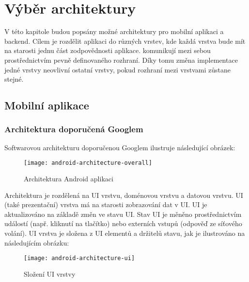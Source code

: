 \chapter{Výběr architektury}

\begin{chapterabstract}
	V této kapitole budou popsány možné architektury pro mobilní aplikaci a backend. Cílem je rozdělit aplikaci do různých vrstev, kde každá vrstva bude mít na starosti jednu část zodpovědnosti aplikace. komunikují mezi sebou prostřednictvím pevně definovaného rozhraní. Díky tomu změna implementace jedné vrstvy neovlivní ostatní vrstvy, pokud rozhraní mezi vrstvami zůstane stejné.
\end{chapterabstract}

\section{Mobilní aplikace}

\subsection{Architektura doporučená Googlem}
\label{subsec:architecture-google}
Softwarovou architekturu doporučenou Googlem \cite{android-architecture} ilustruje následující obrázek:

\begin{figure}[h!]
	\centering
	
	\texttt{[image: android-architecture-overall]}
	
	\caption{Architektura Android aplikaci \cite{android-architecture}}
	\label{fig:android-architecture-overall}
\end{figure}

\noindent Architektura je rozdělená na UI vrstvu, doménovou vrstvu a datovou vrstvu. UI (také prezentační) vrstva má na starosti zobrazování dat v UI. UI je aktualizováno na základě změn ve stavu UI. Stav UI je měněno prostřednictvím událostí (např. kliknutí na tlačítko) nebo externích vstupů (odpověď ze síťového volání). UI vrstva je složena z UI elementů a držitelů stavu, jak je ilustrováno na následujícím obrázku:

\begin{figure}[H]
	\centering
	
	\texttt{[image: android-architecture-ui]}
	
	\caption{Složení UI vrstvy \cite{android-architecture}}
	\label{fig:android-architecture-ui}
\end{figure}

